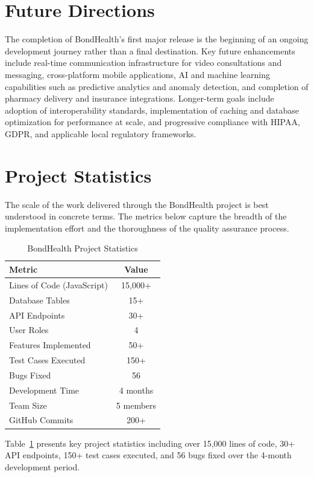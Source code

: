 \section{Future Directions}

\noindent The completion of BondHealth's first major release is the beginning of an ongoing development journey rather than a final destination. Key future enhancements include real-time communication infrastructure for video consultations and messaging, cross-platform mobile applications, AI and machine learning capabilities such as predictive analytics and anomaly detection, and completion of pharmacy delivery and insurance integrations. Longer-term goals include adoption of interoperability standards, implementation of caching and database optimization for performance at scale, and progressive compliance with HIPAA, GDPR, and applicable local regulatory frameworks.

\section{Project Statistics}

\noindent The scale of the work delivered through the BondHealth project is best understood in concrete terms. The metrics below capture the breadth of the implementation effort and the thoroughness of the quality assurance process.

\begin{table}[H]
\centering
\caption{BondHealth Project Statistics}
\label{tab:stats}
\begin{tabular}{|l|c|}
\hline
\textbf{Metric} & \textbf{Value} \\
\hline
Lines of Code (JavaScript) & 15,000+ \\
\hline
Database Tables & 15+ \\
\hline
API Endpoints & 30+ \\
\hline
User Roles & 4 \\
\hline
Features Implemented & 50+ \\
\hline
Test Cases Executed & 150+ \\
\hline
Bugs Fixed & 56 \\
\hline
Development Time & 4 months \\
\hline
Team Size & 5 members \\
\hline
GitHub Commits & 200+ \\
\hline
\end{tabular}
\end{table}
\noindent Table~\ref{tab:stats} presents key project statistics including over 15,000 lines of code, 30+ API endpoints, 150+ test cases executed, and 56 bugs fixed over the 4-month development period.

